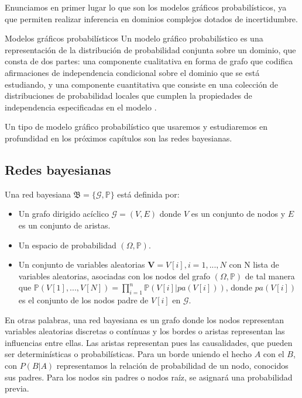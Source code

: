 Enunciamos en primer lugar lo que son los modelos gráficos probabilísticos, ya que permiten realizar 
inferencia en dominios complejos dotados de incertidumbre.

\begin{definicion}{Modelos gráficos probabilísticos} \label{subsect:modelos}
Un modelo gráfico probabilístico es una representación de la distribución de probabilidad conjunta 
sobre un dominio, que consta de dos partes: una componente cualitativa
en forma de grafo que codifica afirmaciones de independencia condicional sobre el 
dominio que se está estudiando, y una componente cuantitativa que consiste en una colección de 
distribuciones de probabilidad locales que cumplen la propiedades de independencia especificadas 
en el modelo \cite{inference-rev-hbn}. 
\end{definicion}

Un tipo de modelo gráfico probabilístico que usaremos y estudiaremos en profundidad en los próximos 
capítulos son las redes bayesianas.

\subsection{Redes bayesianas} \label{subsect:BN}
\begin{definicion} \label{def:BN}
Una red bayesiana \cite{def-bncn} $\mathfrak{B} = \lbrace \mathcal{G}, \mathbb{P} \rbrace$ está definida por:
\begin{itemize}
    \item Un grafo dirigido acíclico $\mathcal{G}=(V,E)$ donde $V$ es un conjunto de nodos y $E$ 
    es un conjunto de aristas.
    \item Un espacio de probabilidad $(\Omega, \mathbb{P})$.
    \item Un conjunto de variables aleatorias $\textbf{V}=V[i], i=1,...,N$ con N lista de variables aleatorias, 
    asociadas con los nodos del grafo $(\Omega, \mathbb{P})$ 
    de tal manera que $\mathbb{P}(V[1],...,V[N])= \prod_{i=1}^{n}\mathbb{P}(V[i]|pa(V[i]))$, donde $pa(V[i])$ es el 
    conjunto de los nodos padre de $V[i]$ en $\mathcal{G}$.  
\end{itemize}
\end{definicion} 

En otras palabras, una red bayesiana es un grafo donde los nodos representan variables aleatorias discretas 
o contínuas y los bordes o aristas representan las influencias entre ellas. Las aristas 
representan pues las causalidades, que pueden ser determinísticas o probabilísticas. Para un borde 
uniendo el hecho $A$ con el $B$, con $P(B|A)$ representamos la relación de probabilidad de un 
nodo, conocidos sus padres. Para los nodos sin padres o nodos raíz, se asignará una probabilidad previa.

